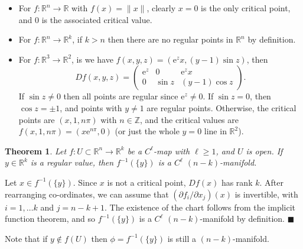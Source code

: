 \documentclass[letter-paper]{tufte-book}
\newtheorem{theorem}{\color{pastel-blue}Theorem}[section]
\newenvironment{proof}[1][Proof]{\begin{trivlist}
\item[\hskip \labelsep {\bfseries #1}]}{\end{trivlist}}
\newenvironment{example}[1][Example]{\begin{trivlist}
\item[\hskip \labelsep {\bfseries #1}]}{\end{trivlist}}
\newcommand{\ex}{\mathrm{e}}
\newcommand{\qed}{\hfill$\blacksquare$}
\begin{document}
\begin{example}
  \begin{itemize}
    \item For $f: \mathbb{R}^n \to \mathbb{R}$ with $f(x) = \|x\|$, clearly $x =
    0$ is the only critical point, and 0 is the associated critical value.
    
    \item For $f:\mathbb{R}^n \to \mathbb{R}^k$, if $k > n$ then there are no
    regular points in $\mathbb{R}^n$ by definition.
    
    \item For $f:\mathbb{R}^3 \to \mathbb{R}^2$, is we have $f(x,y,z) = (\ex^z
    x, (y-1) \sin z)$, then
    \begin{equation*}
      Df(x,y,z) = \begin{pmatrix}
         \ex^z & 0 & \ex^z x\\
         0 & \sin z & (y-1)\cos z
      \end{pmatrix}.
    \end{equation*}
    If $\sin z \neq 0$ then all points are regular since $\ex^z \neq 0$. If
    $\sin z = 0$, then $\cos z = \pm 1$, and points with $y\neq 1$ are regular
    points. Otherwise, the critical points are $(x, 1, n\pi)$ with
    $n\in\mathbb{Z}$, and the critical values are $f(x, 1, n\pi) = (x\ex^{n\pi},
    0)$ (or just the whole $y=0$ line in $\mathbb{R}^2$).
  \end{itemize}
\end{example}

\begin{theorem}
  Let $f : U \subset \mathbb{R}^n \to \mathbb{R}^k$ be a $C^\ell$-map with $\ell
  \geq 1$, and $U$ is open. If $y \in \mathbb{R}^k$ is a regular value, then
  $f^{-1}(\{y\})$ is a $C^\ell$ $(n-k)$-manifold.
\end{theorem}

\begin{proof}
  Let $x \in f^{-1}(\{y\})$. Since $x$ is not a critical point, $Df(x)$ has rank
  $k$. After rearranging co-ordinates, we can assume that $(\partial f_i /
  \partial x_j)(x)$ is invertible, with $i = 1,\ldots k$ and $j = n-k+1$. The
  existence of the chart follows from the implicit function theorem, and so
  $f^{-1}(\{y\})$ is a $C^\ell$ $(n-k)$-manifold by definition. \qed
\end{proof}

Note that if $y \notin f(U)$ then $\phi = f^{-1}(\{y\})$ is still a
$(n-k)$-manifold.
\end{document}
